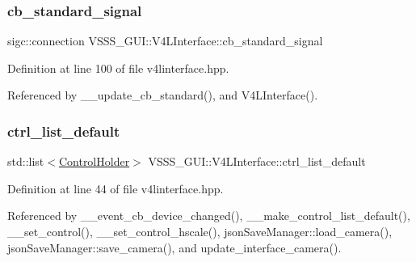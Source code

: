 \subsubsection{\texorpdfstring{cb\+\_\+standard\+\_\+signal}{cb\_standard\_signal}}
{\footnotesize\ttfamily sigc\+::connection V\+S\+S\+S\+\_\+\+G\+U\+I\+::\+V4\+L\+Interface\+::cb\+\_\+standard\+\_\+signal}



Definition at line 100 of file v4linterface.\+hpp.



Referenced by \+\_\+\+\_\+update\+\_\+cb\+\_\+standard(), and V4\+L\+Interface().

\mbox{\label{class_v_s_s_s___g_u_i_1_1_v4_l_interface_a97faf21f7b67c8ef15ceeafa377c6ea4}} 
\subsubsection{\texorpdfstring{ctrl\+\_\+list\+\_\+default}{ctrl\_list\_default}}
{\footnotesize\ttfamily std\+::list$<$\hyperlink{namespace_v_s_s_s___g_u_i_a9eff2f5504f050458ee4bcf362482a8d}{Control\+Holder}$>$ V\+S\+S\+S\+\_\+\+G\+U\+I\+::\+V4\+L\+Interface\+::ctrl\+\_\+list\+\_\+default}



Definition at line 44 of file v4linterface.\+hpp.



Referenced by \+\_\+\+\_\+event\+\_\+cb\+\_\+device\+\_\+changed(), \+\_\+\+\_\+make\+\_\+control\+\_\+list\+\_\+default(), \+\_\+\+\_\+set\+\_\+control(), \+\_\+\+\_\+set\+\_\+control\+\_\+hscale(), json\+Save\+Manager\+::load\+\_\+camera(), json\+Save\+Manager\+::save\+\_\+camera(), and update\+\_\+interface\+\_\+camera().

\mbox{\label{class_v_s_s_s___g_u_i_1_1_v4_l_interface_a0bd3c429f8b0d92b2b53353dc31e346e}} 
